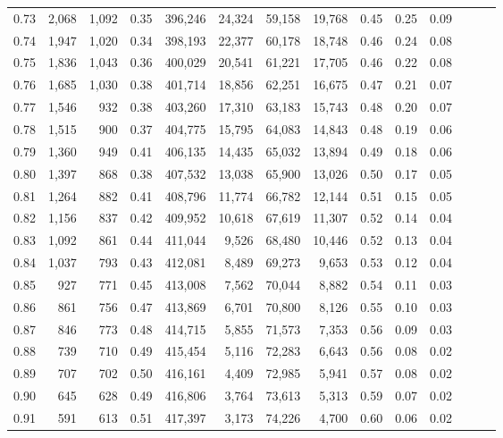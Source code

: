 \begin{tabular}{rrrrrrrrrrrrrr}
0.73 &  2,068 &  1,092 &  0.35 &  396,246 &   24,324 &  59,158 &  19,768 &  0.45 &  0.25 &      0.09 \\
0.74 &  1,947 &  1,020 &  0.34 &  398,193 &   22,377 &  60,178 &  18,748 &  0.46 &  0.24 &      0.08 \\
0.75 &  1,836 &  1,043 &  0.36 &  400,029 &   20,541 &  61,221 &  17,705 &  0.46 &  0.22 &      0.08 \\
0.76 &  1,685 &  1,030 &  0.38 &  401,714 &   18,856 &  62,251 &  16,675 &  0.47 &  0.21 &      0.07 \\
0.77 &  1,546 &    932 &  0.38 &  403,260 &   17,310 &  63,183 &  15,743 &  0.48 &  0.20 &      0.07 \\
0.78 &  1,515 &    900 &  0.37 &  404,775 &   15,795 &  64,083 &  14,843 &  0.48 &  0.19 &      0.06 \\
0.79 &  1,360 &    949 &  0.41 &  406,135 &   14,435 &  65,032 &  13,894 &  0.49 &  0.18 &      0.06 \\
0.80 &  1,397 &    868 &  0.38 &  407,532 &   13,038 &  65,900 &  13,026 &  0.50 &  0.17 &      0.05 \\
0.81 &  1,264 &    882 &  0.41 &  408,796 &   11,774 &  66,782 &  12,144 &  0.51 &  0.15 &      0.05 \\
0.82 &  1,156 &    837 &  0.42 &  409,952 &   10,618 &  67,619 &  11,307 &  0.52 &  0.14 &      0.04 \\
0.83 &  1,092 &    861 &  0.44 &  411,044 &    9,526 &  68,480 &  10,446 &  0.52 &  0.13 &      0.04 \\
0.84 &  1,037 &    793 &  0.43 &  412,081 &    8,489 &  69,273 &   9,653 &  0.53 &  0.12 &      0.04 \\
0.85 &    927 &    771 &  0.45 &  413,008 &    7,562 &  70,044 &   8,882 &  0.54 &  0.11 &      0.03 \\
0.86 &    861 &    756 &  0.47 &  413,869 &    6,701 &  70,800 &   8,126 &  0.55 &  0.10 &      0.03 \\
0.87 &    846 &    773 &  0.48 &  414,715 &    5,855 &  71,573 &   7,353 &  0.56 &  0.09 &      0.03 \\
0.88 &    739 &    710 &  0.49 &  415,454 &    5,116 &  72,283 &   6,643 &  0.56 &  0.08 &      0.02 \\
0.89 &    707 &    702 &  0.50 &  416,161 &    4,409 &  72,985 &   5,941 &  0.57 &  0.08 &      0.02 \\
0.90 &    645 &    628 &  0.49 &  416,806 &    3,764 &  73,613 &   5,313 &  0.59 &  0.07 &      0.02 \\
0.91 &    591 &    613 &  0.51 &  417,397 &    3,173 &  74,226 &   4,700 &  0.60 &  0.06 &      0.02 \\

\end{tabular}
